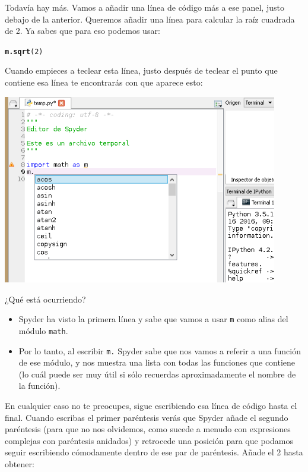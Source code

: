 \documentclass[10pt,a4paper]{article}\usepackage[]{graphicx}\usepackage[]{color}
\makeatletter
\newcommand{\hlnum}[1]{\textcolor[rgb]{0.686,0.059,0.569}{#1}}%
\newcommand{\hlstd}[1]{\textcolor[rgb]{0.345,0.345,0.345}{#1}}%
\newcommand{\hlkwd}[1]{\textcolor[rgb]{0.737,0.353,0.396}{\textbf{#1}}}%
\newenvironment{kframe}{%
 \def\at@end@of@kframe{}%
 \ifinner\ifhmode%
  \def\at@end@of@kframe{\end{minipage}}%
  \begin{minipage}{\columnwidth}%
 \fi\fi%
 \def\FrameCommand##1{\hskip\@totalleftmargin \hskip-\fboxsep
 \colorbox{shadecolor}{##1}\hskip-\fboxsep
     \hskip-\linewidth \hskip-\@totalleftmargin \hskip\columnwidth}%
 \MakeFramed {\advance\hsize-\width
   \@totalleftmargin\z@ \linewidth\hsize
   \@setminipage}}%
 {\par\unskip\endMakeFramed%
 \at@end@of@kframe}
\newenvironment{knitrout}{}{} %
\newcounter {cont01}
\makeatother
\begin{document}
Todavía hay más. Vamos a añadir una línea de código más a ese panel, justo debajo de la anterior. Queremos añadir una línea para calcular la raíz cuadrada de 2. Ya sabes que para eso podemos usar:
\begin{knitrout}
\color{fgcolor}\begin{kframe}
\begin{alltt}
\hlkwd{m.sqrt}\hlstd{(}\hlnum{2}\hlstd{)}
\end{alltt}
\end{kframe}
\end{knitrout}
Cuando empieces a teclear esta línea, justo después de teclear el punto que contiene esa línea te encontrarás con que aparece esto:
\begin{center}
\includegraphics[width=12cm]{../fig/Tut-02-py-24-EditorSpyder02.png}
\end{center}
¿Qué está ocurriendo?
\begin{itemize}
  \item Spyder ha visto la primera línea y sabe que vamos a usar {\tt m} como alias del módulo {\tt math}.
  \item Por lo tanto, al escribir {\tt m.} Spyder sabe que nos vamos a referir a una función de ese módulo, y nos muestra una lista con todas las funciones que contiene (lo cuál puede ser muy útil si sólo recuerdas aproximadamente el nombre de la función). 
\end{itemize}
En cualquier caso no te preocupes, sigue escribiendo esa línea de código hasta el final. Cuando escribas el primer paréntesis verás que Spyder añade el segundo paréntesis (para que no nos olvidemos, como sucede a menudo con expresiones complejas con paréntesis anidados) y retrocede una posición para que podamos seguir escribiendo cómodamente dentro de ese par de paréntesis. Añade el 2 hasta obtener:
\end{document}

